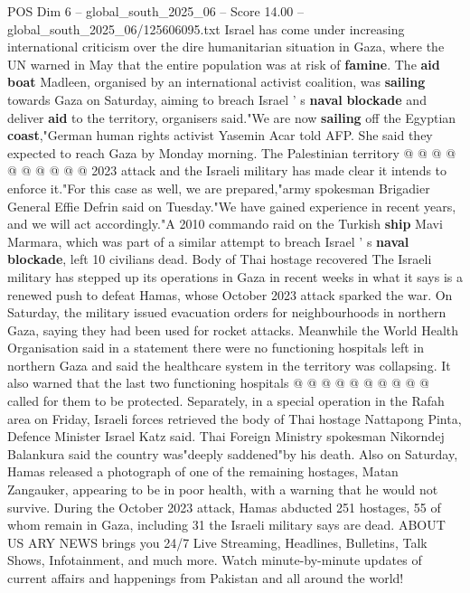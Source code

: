 \begin{textsample}{POS Dim 6 – global\_south\_2025\_06 – Score 14.00 – global\_south\_2025\_06/125606095.txt}
Israel has come under increasing international criticism over the dire humanitarian situation in Gaza, where the UN warned in May that the entire population was at risk of \textbf{famine}.
The \textbf{aid} \textbf{boat} Madleen, organised by an international activist coalition, was \textbf{sailing} towards Gaza on Saturday, aiming to breach Israel ' s \textbf{naval} \textbf{blockade} and deliver \textbf{aid} to the territory, organisers said."We are now \textbf{sailing} off the Egyptian \textbf{coast},"German human rights activist Yasemin Acar told AFP.
She said they expected to reach Gaza by Monday morning.
The Palestinian territory @ @ @ @ @ @ @ @ @ @ 2023 attack and the Israeli military has made clear it intends to enforce it."For this case as well, we are prepared,"army spokesman Brigadier General Effie Defrin said on Tuesday."We have gained experience in recent years, and we will act accordingly."A 2010 commando raid on the Turkish \textbf{ship} Mavi Marmara, which was part of a similar attempt to breach Israel ' s \textbf{naval} \textbf{blockade}, left 10 civilians dead.
Body of Thai hostage recovered The Israeli military has stepped up its operations in Gaza in recent weeks in what it says is a renewed push to defeat Hamas, whose October 2023 attack sparked the war.
On Saturday, the military issued evacuation orders for neighbourhoods in northern Gaza, saying they had been used for rocket attacks.
Meanwhile the World Health Organisation said in a statement there were no functioning hospitals left in northern Gaza and said the healthcare system in the territory was collapsing.
It also warned that the last two functioning hospitals @ @ @ @ @ @ @ @ @ @ called for them to be protected.
Separately, in a special operation in the Rafah area on Friday, Israeli forces retrieved the body of Thai hostage Nattapong Pinta, Defence Minister Israel Katz said.
Thai Foreign Ministry spokesman Nikorndej Balankura said the country was"deeply saddened"by his death.
Also on Saturday, Hamas released a photograph of one of the remaining hostages, Matan Zangauker, appearing to be in poor health, with a warning that he would not survive.
During the October 2023 attack, Hamas abducted 251 hostages, 55 of whom remain in Gaza, including 31 the Israeli military says are dead.
ABOUT US ARY NEWS brings you 24/7 Live Streaming, Headlines, Bulletins, Talk Shows, Infotainment, and much more.
Watch minute-by-minute updates of current affairs and happenings from Pakistan and all around the world!

\end{textsample}
